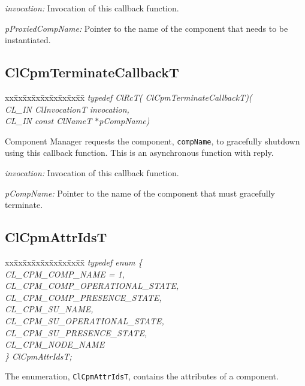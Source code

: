 {{\em invocation:} Invocation of this callback function.

{\em p\-Proxied\-Comp\-Name:} Pointer to the name of the component that needs to be instantiated. 



\subsection{ClCpmTerminateCallbackT}
\begin{tabbing}
xx\=xx\=xx\=xx\=xx\=xx\=xx\=xx\=xx\=\kill
\textit{typedef ClRcT( ClCpmTerminateCallbackT)(}\\
\>\>\>\>\textit{CL\_IN ClInvocationT invocation, }\\
\>\>\>\>\textit{CL\_IN const ClNameT $\ast$pCompName)}\\
\end{tabbing}

Component Manager requests the component, {\tt{compName}}, to gracefully shutdown using this callback function. This is an asynchronous function with
reply.

{\em invocation:} Invocation of this callback function.

{\em pCompName:} Pointer to the name of the component that must gracefully terminate. 


\subsection{ClCpmAttrIdsT}
  \begin{tabbing}
xx\=xx\=xx\=xx\=xx\=xx\=xx\=xx\=xx\=\kill
\textit{typedef enum \{}\\
\>\>\>\>\textit{CL\_CPM\_COMP\_NAME = 1,}\\
\>\>\>\>\textit{CL\_CPM\_COMP\_OPERATIONAL\_STATE,}\\
\>\>\>\>\textit{CL\_CPM\_COMP\_PRESENCE\_STATE,}\\
\>\>\>\>\textit{CL\_CPM\_SU\_NAME,}\\
\>\>\>\>\textit{CL\_CPM\_SU\_OPERATIONAL\_STATE,}\\
\>\>\>\>\textit{CL\_CPM\_SU\_PRESENCE\_STATE,}\\
\>\>\>\>\textit{CL\_CPM\_NODE\_NAME}\\
\textit{\} ClCpmAttrIdsT;}\\
\end{tabbing}
The enumeration, {\tt{ClCpmAttrIdsT}}, contains the attributes of a component.

}
